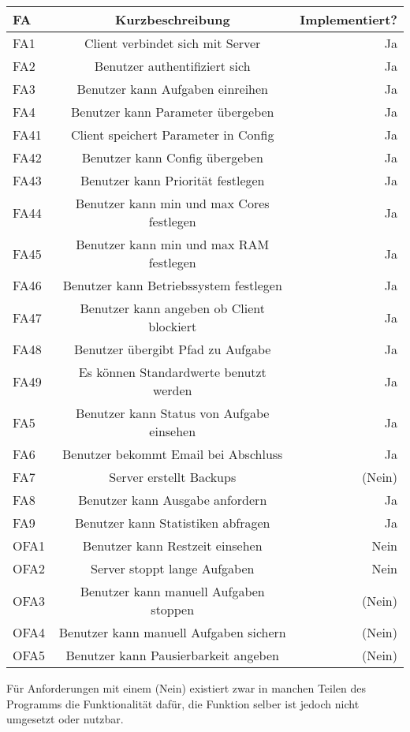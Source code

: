 \documentclass[a4paper,12pt]{article}
\begin{document}
\begin{tabular}{|l|c|r|}
	\hline
	FA & Kurzbeschreibung & Implementiert? \\ \hline \hline
	FA1 & Client verbindet sich mit Server & Ja \\ \hline
	FA2 & Benutzer authentifiziert sich & Ja \\ \hline
	FA3 & Benutzer kann Aufgaben einreihen & Ja \\ \hline
	FA4 & Benutzer kann Parameter übergeben & Ja \\ \hline
	FA41 & Client speichert Parameter in Config & Ja \\ \hline
	FA42 & Benutzer kann Config übergeben & Ja \\ \hline
	FA43 & Benutzer kann Priorität festlegen & Ja \\ \hline
	FA44 & Benutzer kann min und max Cores festlegen & Ja \\ \hline
	FA45 & Benutzer kann min und max RAM festlegen & Ja \\ \hline
	FA46 & Benutzer kann Betriebssystem festlegen & Ja \\ \hline
	FA47 & Benutzer kann angeben ob Client blockiert & Ja \\ \hline
	FA48 & Benutzer übergibt Pfad zu Aufgabe & Ja \\ \hline
	FA49 & Es können Standardwerte benutzt werden & Ja \\ \hline
	FA5 & Benutzer kann Status von Aufgabe einsehen & Ja \\ \hline
	FA6 & Benutzer bekommt Email bei Abschluss & Ja \\ \hline
	FA7 & Server erstellt Backups & (Nein) \\ \hline
	FA8 & Benutzer kann Ausgabe anfordern & Ja \\ \hline
	FA9 & Benutzer kann Statistiken abfragen & Ja \\ \hline \hline
	OFA1 & Benutzer kann Restzeit einsehen & Nein \\ \hline
	OFA2 & Server stoppt lange Aufgaben & Nein \\ \hline
	OFA3 & Benutzer kann manuell Aufgaben stoppen & (Nein) \\ \hline
	OFA4 & Benutzer kann manuell Aufgaben sichern & (Nein) \\ \hline
	OFA5 & Benutzer kann Pausierbarkeit angeben & (Nein) \\ \hline
\end{tabular}
\newline \newline
Für Anforderungen mit einem (Nein) existiert zwar in manchen Teilen des Programms die Funktionalität dafür, die Funktion selber ist jedoch nicht umgesetzt oder nutzbar.
\end{document}
